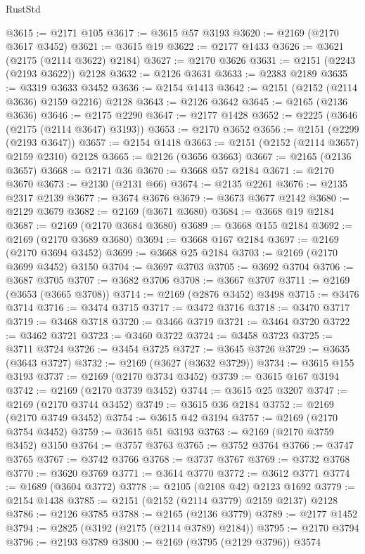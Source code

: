 \begin{lexlean}{RustStd}
\begin{coremodule}
{\begin{coremodule}
{{{{{{{{{{{{{{{{@3615 := @2171 @105
@3617 := @3615 @57 @3193
@3620 := @2169 (@2170 @3617 @3452)
@3621 := @3615 @19
@3622 := @2177 @1433
@3626 := @3621 (@2175 (@2114 @3622) @2184)
@3627 := @2170 @3626
@3631 := @2151 (@2243 (@2193 @3622)) @2128
@3632 := @2126 @3631
@3633 := @2383 @2189
@3635 := @3319 @3633 @3452
@3636 := @2154 @1413
@3642 := @2151 (@2152 (@2114 @3636) @2159 @2216) @2128
@3643 := @2126 @3642
@3645 := @2165 (@2136 @3636)
@3646 := @2175 @2290
@3647 := @2177 @1428
@3652 := @2225 (@3646 (@2175 (@2114 @3647) @3193))
@3653 := @2170 @3652
@3656 := @2151 (@2299 (@2193 @3647))
@3657 := @2154 @1418
@3663 := @2151 (@2152 (@2114 @3657) @2159 @2310) @2128
@3665 := @2126 (@3656 @3663)
@3667 := @2165 (@2136 @3657)
@3668 := @2171 @36
@3670 := @3668 @57 @2184
@3671 := @2170 @3670
@3673 := @2130 (@2131 @66)
@3674 := @2135 @2261
@3676 := @2135 @2317 @2139
@3677 := @3674 @3676
@3679 := @3673 @3677 @2142
@3680 := @2129 @3679
@3682 := @2169 (@3671 @3680)
@3684 := @3668 @19 @2184
@3687 := @2169 (@2170 @3684 @3680)
@3689 := @3668 @155 @2184
@3692 := @2169 (@2170 @3689 @3680)
@3694 := @3668 @167 @2184
@3697 := @2169 (@2170 @3694 @3452)
@3699 := @3668 @25 @2184
@3703 := @2169 (@2170 @3699 @3452) @3150
@3704 := @3697 @3703
@3705 := @3692 @3704
@3706 := @3687 @3705
@3707 := @3682 @3706
@3708 := @3667 @3707
@3711 := @2169 (@3653 (@3665 @3708))
@3714 := @2169 (@2876 @3452) @3498
@3715 := @3476 @3714
@3716 := @3474 @3715
@3717 := @3472 @3716
@3718 := @3470 @3717
@3719 := @3468 @3718
@3720 := @3466 @3719
@3721 := @3464 @3720
@3722 := @3462 @3721
@3723 := @3460 @3722
@3724 := @3458 @3723
@3725 := @3711 @3724
@3726 := @3454 @3725
@3727 := @3645 @3726
@3729 := @3635 (@3643 @3727)
@3732 := @2169 (@3627 (@3632 @3729))
@3734 := @3615 @155 @3193
@3737 := @2169 (@2170 @3734 @3452)
@3739 := @3615 @167 @3194
@3742 := @2169 (@2170 @3739 @3452)
@3744 := @3615 @25 @3207
@3747 := @2169 (@2170 @3744 @3452)
@3749 := @3615 @36 @2184
@3752 := @2169 (@2170 @3749 @3452)
@3754 := @3615 @42 @3194
@3757 := @2169 (@2170 @3754 @3452)
@3759 := @3615 @51 @3193
@3763 := @2169 (@2170 @3759 @3452) @3150
@3764 := @3757 @3763
@3765 := @3752 @3764
@3766 := @3747 @3765
@3767 := @3742 @3766
@3768 := @3737 @3767
@3769 := @3732 @3768
@3770 := @3620 @3769
@3771 := @3614 @3770
@3772 := @3612 @3771
@3774 := @1689 (@3604 @3772)
@3778 := @2105 (@2108 @42) @2123 @1692
@3779 := @2154 @1438
@3785 := @2151 (@2152 (@2114 @3779) @2159 @2137) @2128
@3786 := @2126 @3785
@3788 := @2165 (@2136 @3779)
@3789 := @2177 @1452
@3794 := @2825 (@3192 (@2175 (@2114 @3789) @2184))
@3795 := @2170 @3794
@3796 := @2193 @3789
@3800 := @2169 (@3795 (@2129 @3796)) @3574
}}}}}}}}}}}}}}}}
\end{coremodule}}
\end{coremodule}
\end{lexlean}
